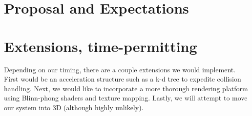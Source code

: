 \documentclass[tog]{acmsiggraph}
\begin{document}
\section{Proposal and Expectations}



\section{Extensions, time-permitting}

Depending on our timing, there are a couple extensions we would implement. First
would be an acceleration structure such as a k-d tree to expedite collision handling.
Next, we would like to incorporate a more thorough rendering platform using Blinn-phong
shaders and texture mapping. Lastly, we will attempt to move our system into 3D (although
highly unlikely).




\end{document}

